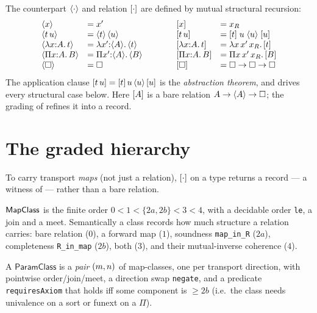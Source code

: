 \begin{definition}
  \label{def:classical}
  The counterpart $\langle \cdot \rangle$ and relation $[ \cdot ]$ are defined by
  mutual structural recursion:
  \[
    \begin{array}{llcll}
      \langle x \rangle          &= x'                 &\qquad& [ x ]         &= x_R \\
      \langle t\,u \rangle       &= \langle t \rangle\,\langle u \rangle   &&      [ t\,u ]      &= [ t ]\; u\; \langle u \rangle\; [ u ] \\
      \langle \lambda x{:}A.\,t \rangle &= \lambda x'{:}\langle A \rangle.\,\langle t \rangle && [ \lambda x{:}A.\,t ] &= \lambda x\,x'\,x_R.\,[ t ] \\
      \langle \Pi x{:}A.\,B \rangle     &= \Pi x'{:}\langle A \rangle.\,\langle B \rangle     && [ \Pi x{:}A.\,B ] &= \Pi x\,x'\,x_R.\,[ B ] \\
      \langle \square \rangle    &= \square            &&      [ \square ]   &= \square \to \square \to \square
    \end{array}
  \]
  The application clause $[ t\,u ] = [ t ]\,u\,\langle u \rangle\,[ u ]$ is the
  \emph{abstraction theorem}, and drives every structural case below. Here
  $[ A ]$ is a bare relation $A \to \langle A \rangle \to \square$; the grading of
   refines it into a record.
\end{definition}

\section{The graded hierarchy}
\label{sec:hierarchy}

To carry transport \emph{maps} (not just a relation), $[ \cdot ]$ on a type
returns a record --- a witness of  --- rather than a bare
relation.

\begin{definition}
  \label{def:map-class}
  \leanok
  $\mathsf{MapClass}$ is the finite order $0 < 1 < \{2a, 2b\} < 3 < 4$, with a
  decidable order \texttt{le}, a join and a meet. Semantically a class records
  how much structure a relation carries: bare relation ($0$), a forward map
  ($1$), soundness \texttt{map\_in\_R} ($2a$), completeness \texttt{R\_in\_map}
  ($2b$), both ($3$), and their mutual-inverse coherence ($4$).
\end{definition}

\begin{definition}
  \label{def:param-class}
  \leanok
  A $\mathsf{ParamClass}$ is a \emph{pair} $(m,n)$ of map-classes, one per
  transport direction, with pointwise order/join/meet, a direction swap
  \texttt{negate}, and a predicate \texttt{requiresAxiom} that holds iff some
  component is $\geq 2b$ (i.e.\ the class needs univalence on a sort or funext on
  a $\Pi$).
\end{definition}

